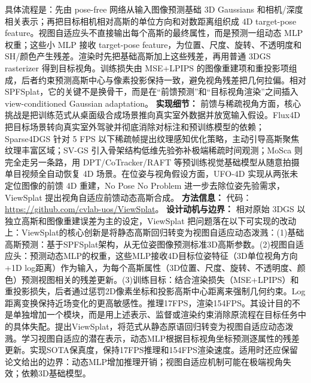 具体流程是：先由 pose-free 网络从输入图像预测基础 3D Gaussians 和相机/深度相关表示；再把目标相机相对高斯的单位方向和对数距离组织成 4D target-pose feature。视图自适应头不直接输出每个高斯的最终属性，而是预测一组动态 MLP 权重；这些小 MLP 接收 target-pose feature，为位置、尺度、旋转、不透明度和 SH/颜色产生残差。渲染时先把基础高斯加上这些残差，再用普通 3DGS rasterizer 得到目标视角。训练损失由 MSE+LPIPS 的图像重建项和重投影项组成，后者约束预测高斯中心与像素投影保持一致，避免视角残差把几何拉偏。相对 SPFSplat，它的关键不是换骨干，而是在“前馈预测”和“目标视角渲染”之间插入 view-conditioned Gaussian adaptation。
\textbf{实现细节：} 前馈与稀疏视角方面，核心挑战是把训练范式从桌面级合成场景推向真实室外数据并放宽输入假设。Flux4D 把目标场景转向真实室外驾驶并彻底消除对标注和预训练模型的依赖；Sparse4DGS 针对 5 FPS 以下稀疏帧提出纹理感知优化策略，主动引导高斯聚焦纹理丰富区域；SV-GS 引入骨架结构低维先验弥补极端稀疏时间观测；MoSca 则完全走另一条路，用 DPT/CoTracker/RAFT 等预训练视觉基础模型从随意拍摄单目视频全自动恢复 4D 场景。在位姿与视角假设方面，UFO-4D 实现从两张未定位图像的前馈 4D 重建，No Pose No Problem 进一步去除位姿先验需求，ViewSplat 提出视角自适应前馈动态高斯合成。
\textbf{方法信息：} 代码：\url{https://github.com/cvlab-uos/ViewSplat}。
\textbf{设计动机与边界：} 相对原始 3DGS 以独立高斯和图像重建误差为主的设定，ViewSplat 把问题落在以下可实现的改动上：ViewSplat的核心创新是将静态高斯回归转变为视图自适应动态泼溅：(1)基础高斯预测：基于SPFSplat架构，从无位姿图像预测标准3D高斯参数。(2)视图自适应头：预测动态MLP的权重，这些MLP接收4D目标位姿特征（3D单位视角方向+1D log距离）作为输入，为每个高斯属性（3D位置、尺度、旋转、不透明度、颜色）预测视图相关的残差更新。(3)训练目标：结合渲染损失（MSE+LPIPS）和重投影损失，后者通过惩罚2D像素坐标和投影高斯中心距离来强制几何约束。Log距离变换保持近场变化的更高敏感性。推理17FPS，渲染154FPS。其设计目的不是单独增加一个模块，而是用上述表示、监督或渲染约束消除原流程在目标任务中的具体失配。提出ViewSplat，将范式从静态原语回归转变为视图自适应动态泼溅。学习视图自适应的潜在表示，动态MLP根据目标视角坐标预测逐属性的残差更新。实现SOTA保真度，保持17FPS推理和154FPS渲染速度。适用时还应保留论文给出的边界：动态MLP增加推理开销；视图自适应机制可能在极端视角失效；依赖3D基础模型。

